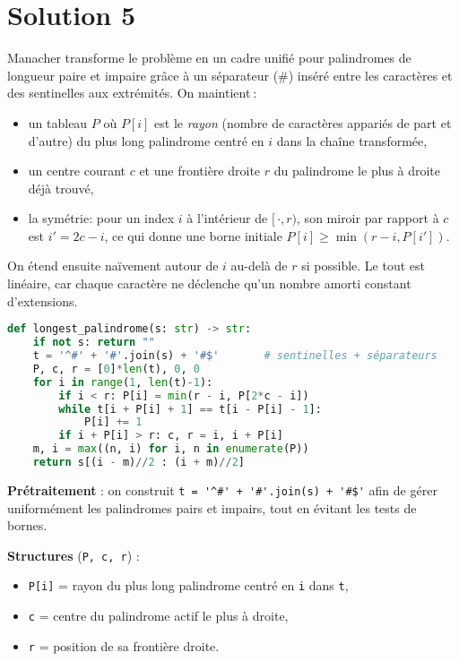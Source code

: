 \documentclass[12pt, a4paper]{article}
\begin{document}
\section*{Solution 5}

Manacher transforme le problème en un cadre unifié pour palindromes de longueur paire et impaire grâce à un séparateur (\#) inséré entre les caractères et des sentinelles aux extrémités. On maintient :
\begin{itemize}
  \item un tableau $P$ où $P[i]$ est le \emph{rayon} (nombre de caractères appariés de part et d'autre) du plus long palindrome centré en $i$ dans la chaîne transformée,
  \item un centre courant $c$ et une frontière droite $r$ du palindrome le plus à droite déjà trouvé,
  \item la symétrie: pour un index $i$ à l'intérieur de $[\,\cdot, r)$, son miroir par rapport à $c$ est $i' = 2c - i$, ce qui donne une borne initiale $P[i] \ge \min(r-i, P[i'])$.
\end{itemize}
On étend ensuite naïvement autour de $i$ au-delà de $r$ si possible. Le tout est linéaire, car chaque caractère ne déclenche qu'un nombre amorti constant d'extensions.
\vspace{5mm}

\begin{lstlisting}[language=Python, label={code:palindrome4}]
def longest_palindrome(s: str) -> str:
    if not s: return ""
    t = '^#' + '#'.join(s) + '#$'       # sentinelles + séparateurs
    P, c, r = [0]*len(t), 0, 0
    for i in range(1, len(t)-1):
        if i < r: P[i] = min(r - i, P[2*c - i])
        while t[i + P[i] + 1] == t[i - P[i] - 1]:
            P[i] += 1
        if i + P[i] > r: c, r = i, i + P[i]
    m, i = max((n, i) for i, n in enumerate(P))
    return s[(i - m)//2 : (i + m)//2]
\end{lstlisting}

\textbf{Prétraitement} : on construit \lstinline{t = '^#' + '#'.join(s) + '#$'} afin de gérer uniformément les palindromes pairs et impairs, tout en évitant les tests de bornes.  

\textbf{Structures} (\lstinline{P, c, r}) :  
\begin{itemize}
  \item \lstinline{P[i]} = rayon du plus long palindrome centré en \lstinline{i} dans \lstinline{t},
  \item \lstinline{c} = centre du palindrome actif le plus à droite,
  \item \lstinline{r} = position de sa frontière droite.
\end{itemize}
\end{document}
